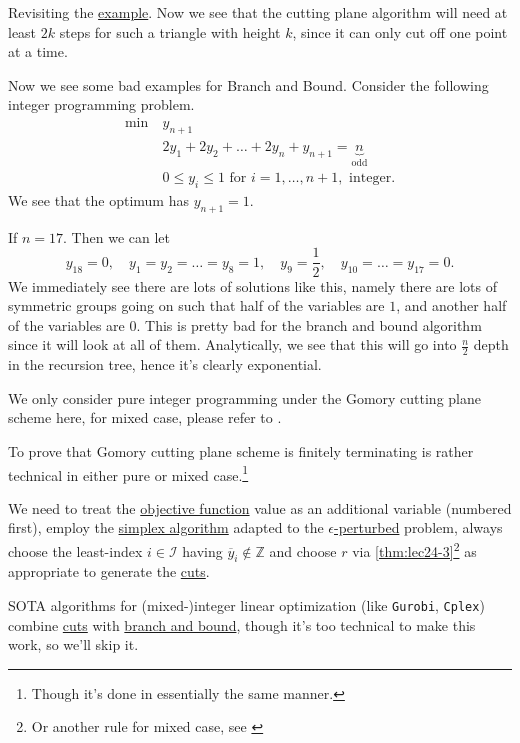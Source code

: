 Revisiting the \hyperref[eg:branch-and-bound]{example}. Now we see that the cutting plane algorithm will need at least \(2k\) steps for such a triangle with height \(k\), since it can only cut off one point at a time.

\begin{eg}
	Now we see some bad examples for Branch and Bound. Consider the following integer programming problem.
	\[
		\begin{aligned}
			\min~ & y_{n+1}                                                             \\
			      & 2y_{1} + 2y_2 + \dots +2y_n + y_{n+1} = \underbrace{n}_{\text{odd}} \\
			      & 0\leq y_{i}\leq 1 \text{ for }i = 1, \dots , n+1, \text{ integer}.
		\end{aligned}
	\]
	We see that the optimum has \(y_{n+1} = 1\).

	If \(n = 17\). Then we can let
	\[
		y_{18} = 0,\quad y_1 = y_2 = \dots = y_8 = 1,\quad y_9 = \frac{1}{2},\quad y_{10} = \dots = y_{17} = 0.
	\]
	We immediately see there are lots of solutions like this, namely there are lots of symmetric groups going on such that half of the variables are \(1\), and another half of the variables are \(0\). This is pretty bad for the branch and bound algorithm since it will look at all of them. Analytically, we see that this will go into \(\frac{n}{2}\) depth in the recursion tree, hence it's clearly exponential.
\end{eg}

\begin{remark}
	We only consider pure integer programming under the Gomory cutting plane scheme here, for mixed case, please refer to \cite{Linear-Opt}.
\end{remark}

\begin{remark}
	To prove that Gomory cutting plane scheme is finitely terminating is rather technical in either pure or mixed case.\footnote{Though it's done in essentially the same manner.}

	We need to treat the \hyperref[def:objective-function]{objective function} value as an additional variable (numbered first), employ the \hyperref[algo:simplex-algorithm]{simplex algorithm} adapted to the \hyperref[def:perturbed-problem]{\(\epsilon \)-perturbed} problem, always choose the least-index \(i\in \mathcal{I} \) having \(\overline{y} _i \notin \mathbb{Z} \) and choose \(r\) via \autoref{thm:lec24-3}\footnote{Or another rule for mixed case, see \cite{Linear-Opt}} as appropriate to generate the \hyperref[def:Chvatal-Gomory-cut]{cuts}.
\end{remark}

\begin{remark}
	SOTA algorithms for (mixed-)integer linear optimization (like \texttt{Gurobi}, \texttt{Cplex}) combine \hyperref[def:Chvatal-Gomory-cut]{cuts} with \hyperref[algo:branch-and-bound-algorithm]{branch and bound}, though it's too technical to make this work, so we'll skip it.
\end{remark}